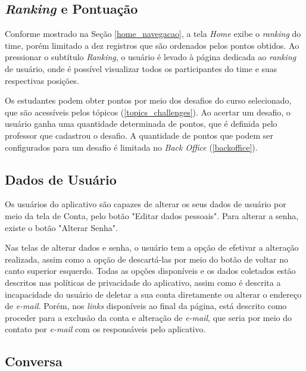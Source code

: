 \subsection{\textit{Ranking} e Pontuação}
\label{ranking}

Conforme mostrado na Seção \ref{home_navegacao}, a tela \textit{Home} exibe o \textit{ranking} do time, porém limitado a dez registros que são ordenados pelos pontos obtidos. Ao pressionar o subtítulo \textit{Ranking}, o usuário é levado à página dedicada ao \textit{ranking} de usuário, onde é possível visualizar todos os participantes do time e suas respectivas posições.


Os estudantes podem obter pontos por meio dos desafios do curso selecionado, que são acessíveis pelos tópicos (\ref{topics_challenges}). Ao acertar um desafio, o usuário ganha uma quantidade determinada de pontos, que é definida pelo professor que cadastrou o desafio. A quantidade de pontos que podem ser configurados para um desafio é limitada no \textit{Back Office} (\ref{backoffice}).

\subsection{Dados de Usuário}

Os usuários do aplicativo são capazes de alterar os seus dados de usuário por meio da tela de Conta, pelo botão "Editar dados pessoais". Para alterar a senha, existe o botão "Alterar Senha".


Nas telas de alterar dados e senha, o usuário tem a opção de efetivar a alteração realizada, assim como a opção de descartá-las por meio do botão de voltar no canto superior esquerdo. Todas as opções disponíveis e os dados coletados estão descritos nas políticas de privacidade do aplicativo, assim como é descrita a incapacidade do usuário de deletar a sua conta diretamente ou alterar o endereço de \textit{e-mail}. Porém, nos \textit{links} disponíveis ao final da página, está descrito como proceder para a exclusão da conta e alteração de \textit{e-mail}, que seria por meio do contato por \textit{e-mail} com os responsáveis pelo aplicativo.

\subsection{Conversa}

